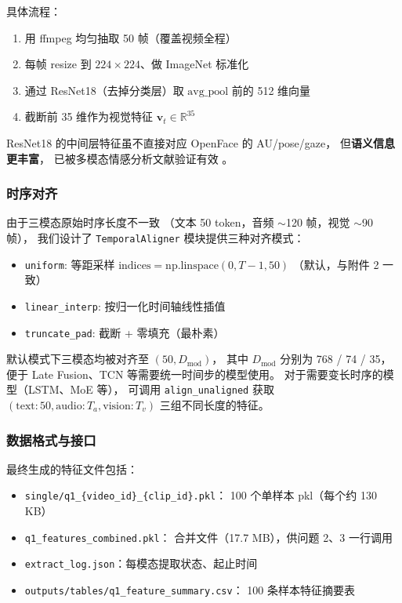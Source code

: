 具体流程：
\begin{enumerate}
    \item 用 ffmpeg 均匀抽取 50 帧（覆盖视频全程）
    \item 每帧 resize 到 $224\times 224$、做 ImageNet 标准化
    \item 通过 ResNet18（去掉分类层）取 $\text{avg\_pool}$ 前的 512 维向量
    \item 截断前 35 维作为视觉特征 $\mathbf{v}_t \in \mathbb{R}^{35}$
\end{enumerate}

ResNet18 的中间层特征虽不直接对应 OpenFace 的 AU/pose/gaze，
但\textbf{语义信息更丰富}，
已被多模态情感分析文献验证有效 \cite{wang2015resnet}。

\subsubsection{时序对齐}

由于三模态原始时序长度不一致
（文本 50 token，音频 $\sim$120 帧，视觉 $\sim$90 帧），
我们设计了 \texttt{TemporalAligner} 模块提供三种对齐模式：

\begin{itemize}
    \item \texttt{uniform}: 等距采样
          $\text{indices} = \text{np.linspace}(0, T-1, 50)$
          （默认，与附件 2 一致）
    \item \texttt{linear\_interp}: 按归一化时间轴线性插值
    \item \texttt{truncate\_pad}: 截断 + 零填充（最朴素）
\end{itemize}

默认模式下三模态均被对齐至 $(50, D_{\text{mod}})$，
其中 $D_{\text{mod}}$ 分别为 768 / 74 / 35，
便于 Late Fusion、TCN 等需要统一时间步的模型使用。
对于需要变长时序的模型（LSTM、MoE 等），
可调用 \texttt{align\_unaligned} 获取
$(\text{text}: 50, \text{audio}: T_a, \text{vision}: T_v)$ 三组不同长度的特征。

\subsubsection{数据格式与接口}

最终生成的特征文件包括：

\begin{itemize}
    \item \texttt{single/q1\_\{video\_id\}\_\{clip\_id\}.pkl}：
          100 个单样本 pkl（每个约 130 KB）
    \item \texttt{q1\_features\_combined.pkl}：
          合并文件（17.7 MB），供问题 2、3 一行调用
    \item \texttt{extract\_log.json}：每模态提取状态、起止时间
    \item \texttt{outputs/tables/q1\_feature\_summary.csv}：
          100 条样本特征摘要表
\end{itemize}

